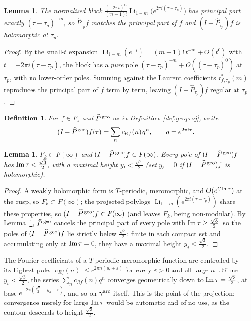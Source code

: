 \documentclass[11pt]{article}
\newtheorem{lemma}[theorem]{Lemma}
\newtheorem{definition}[theorem]{Definition}
\DeclareMathOperator{\Li}{Li}
\begin{document}
\begin{lemma}\label{lem:proj_arc}
The normalized block $\frac{(-2\pi i)^m}{(m-1)!}\Li_{1-m}\big(e^{2\pi i(\tau-\tau_p)}\big)$ has
principal part exactly $(\tau-\tau_p)^{-m}$, so $\widehat P_{\tau_p}f$ matches the principal part
of $f$ and $(I-\widehat P_{\tau_p})f$ is holomorphic at $\tau_p$.
\end{lemma}
\begin{proof}
By the small-$t$ expansion $\Li_{1-m}(e^{-t})=(m-1)!\,t^{-m}+O(t^0)$ with
$t=-2\pi i(\tau-\tau_p)$, the block has a \emph{pure} pole
$(\tau-\tau_p)^{-m}+O((\tau-\tau_p)^0)$ at $\tau_p$, with no lower-order poles. Summing against the
Laurent coefficients $r^*_{f,\tau_p}(m)$ reproduces the principal part of $f$ term by term, leaving
$(I-\widehat P_{\tau_p})f$ regular at $\tau_p$.
\end{proof}

\begin{definition}\label{def:cRf_arc}
For $f\in F_k$ and $\widehat P^{\,\rm geo}$ as in Definition~\ref{def:geoproj}, write
\begin{equation}
(I-\widehat P^{\,\rm geo})f(\tau)=\sum_n c_{Rf}(n)\,q^n,\qquad q=e^{2\pi i\tau}.
\end{equation}
\end{definition}

\begin{lemma}\label{lem:projspace_arc}
$F_k\subset F(\infty)$ and $(I-\widehat P^{\,\rm geo})f\in F(\infty)$. Every pole of
$(I-\widehat P^{\,\rm geo})f$ has ${\rm Im}\,\tau<\tfrac{\sqrt3}{2}$, with a maximal height
$y_b<\tfrac{\sqrt3}{2}$ (set $y_b=0$ if $(I-\widehat P^{\,\rm geo})f$ is holomorphic).
\end{lemma}
\begin{proof}
A weakly holomorphic form is $T$-periodic, meromorphic, and $O(e^{C{\rm Im}\tau})$ at the cusp, so
$F_k\subset F(\infty)$; the projected polylogs $\Li_{1-m}(e^{2\pi i(\tau-\tau_p)})$ share these
properties, so $(I-\widehat P^{\,\rm geo})f\in F(\infty)$ (and leaves $F_k$, being non-modular). By
Lemma~\ref{lem:proj_arc}, $\widehat P^{\,\rm geo}$ cancels the principal part of every pole with
${\rm Im}\,\tau\ge\tfrac{\sqrt3}{2}$, so the poles of $(I-\widehat P^{\,\rm geo})f$ lie strictly
below $\tfrac{\sqrt3}{2}$; finite in each compact set and accumulating only at ${\rm Im}\,\tau=0$,
they have a maximal height $y_b<\tfrac{\sqrt3}{2}$.
\end{proof}

The Fourier coefficients of a $T$-periodic meromorphic function are controlled by its highest pole:
$|c_{Rf}(n)|\le e^{2\pi n(y_b+\varepsilon)}$ for every $\varepsilon>0$ and all large
$n$~\cite{1806}. Since $y_b<\tfrac{\sqrt3}{2}$, the series $\sum_n c_{Rf}(n)q^n$ converges
geometrically down to ${\rm Im}\,\tau=\tfrac{\sqrt3}{2}$, at base
$e^{-2\pi(\frac{\sqrt3}{2}-y_b-\varepsilon)}$, and so on $\gamma^{\rm arc}$ itself. This is the
point of the projection: convergence merely for large ${\rm Im}\,\tau$ would be automatic and of no
use, as the contour descends to height $\tfrac{\sqrt3}{2}$.
\end{document}
